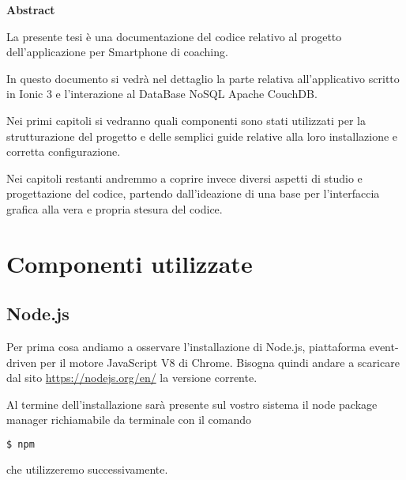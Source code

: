 \documentclass[a4paper,titlepage]{book}
\makeatletter
\newcommand\abstractname{Abstract}  %
\newenvironment{abstract}{%
      \titlepage
      \null\vfil
      \@beginparpenalty\@lowpenalty
      \begin{center}%
        \bfseries \abstractname
        \@endparpenalty\@M
      \end{center}}%
     {\par\vfil\null\endtitlepage}
\newenvironment{abstract}{%
      \if@twocolumn
        \section*{\abstractname}%
      \else
        \small
        \begin{center}%
          {\bfseries \abstractname\vspace{-.5em}\vspace{\z@}}%
        \end{center}%
        \quotation
      \fi}
      {\if@twocolumn\else\endquotation\fi}
\makeatother
\begin{document}
\pagestyle{plain}

\begin{frontespizio}
\end{frontespizio}

\frontmatter

\begin{abstract}
La presente tesi \`{e} una documentazione del codice relativo al progetto dell'applicazione per {\foreignlanguage{english} Smartphone} di {\foreignlanguage{english} coaching}. 

In questo documento si vedr\`{a} nel dettaglio la parte relativa all'applicativo scritto in Ionic 3 e l'interazione al {\foreignlanguage{english} DataBase NoSQL} Apache CouchDB.

Nei primi capitoli si vedranno quali componenti sono stati utilizzati per la strutturazione del progetto e delle semplici guide relative alla loro installazione e corretta configurazione.

Nei capitoli restanti andremmo a coprire invece diversi aspetti di studio e progettazione del codice, partendo dall'ideazione di una base per l'interfaccia grafica alla vera e propria stesura del codice.
\end{abstract}

\tableofcontents

\mainmatter
\chapter{Componenti utilizzate}

\section{Node.js}
Per prima cosa andiamo a osservare l'installazione di Node.js, piattaforma {\foreignlanguage{english} event-driven} per il motore JavaScript V8 di Chrome. Bisogna quindi andare a scaricare dal sito \url{https://nodejs.org/en/} la versione corrente.

Al termine dell'installazione sar\`{a} presente sul vostro sistema il {\foreignlanguage{english} node package manager} richiamabile da terminale con il comando
\begin{lstlisting}[language=bash]
  $ npm
\end{lstlisting}
che utilizzeremo successivamente.
\end{document}
